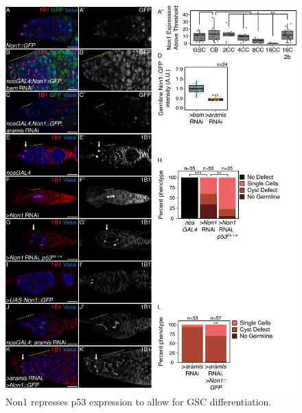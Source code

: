 \documentclass[12pt,oneside]{reedthesis}
\begin{document}
\begin{figure}

{\centering \includegraphics[width=6.5 in,height=8.9375 in]{./figure/Ribosome Biogenesis/Ribosome Biogenesis 5} 

}

\caption[Non1 represses p53 expression to allow for GSC differentiation.]{Non1 represses p53 expression to allow for GSC differentiation.}\label{fig:unnamed-chunk-14}
\end{figure}
\textbf{\hfill\break
}
\end{document}
